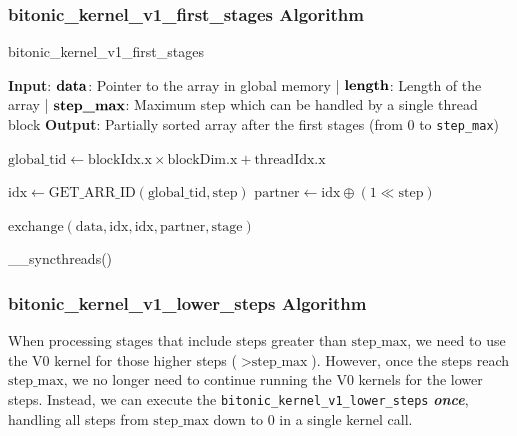 \documentclass[12pt]{article}
\begin{document}
\subsubsection{bitonic\_kernel\_v1\_first\_stages Algorithm}
\begin{algorithm}[H]
\caption{bitonic\_kernel\_v1\_first\_stages}\label{alg:v1_first_stages}
\begin{algorithmic}[1]
\Require \textbf{Input}: 
    \( \text{\textbf{data}} \): Pointer to the array in global memory |  
    \( \text{\textbf{length}} \): Length of the array | 
    \( \text{\textbf{step\_max}} \): Maximum step which can be handled by a single thread block
\Ensure \textbf{Output}: Partially sorted array after the first stages (from 0 to \texttt{step\_max})

\State \( \text{global\_tid} \gets \text{blockIdx.x} \times \text{blockDim.x} + \text{threadIdx.x} \) 
    \State \Return {}
\EndIf

        \State \( \text{idx} \gets \text{GET\_ARR\_ID}(\text{global\_tid}, \text{step}) \) 
        \State \( \text{partner} \gets \text{idx} \oplus (1 \ll \text{step}) \) 
        
            \State \( \text{exchange}(\text{data}, \text{idx}, \text{idx}, \text{partner}, \text{stage}) \) 
        \EndIf
        
        \State \_\_syncthreads() 
    \EndFor
\EndFor
\end{algorithmic}
\end{algorithm}



\subsubsection{bitonic\_kernel\_v1\_lower\_steps Algorithm}

When processing stages that include steps greater than \( \text{step\_max} \), we need to use the V0 kernel for those higher steps (\( > \text{step\_max} \)). However, once the steps reach \( \text{step\_max} \), we no longer need to continue running the V0 kernels for the lower steps. Instead, we can execute the \texttt{bitonic\_kernel\_v1\_lower\_steps} \textbf{\textit{once}}, handling all steps from \( \text{step\_max} \) down to 0 in a single kernel call.
\end{document}
